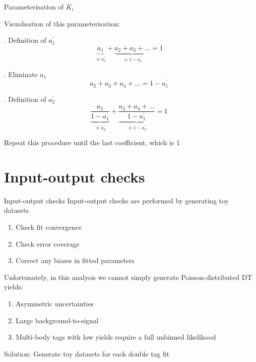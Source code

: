 \documentclass{beamer}
\begin{document}
\begin{frame}{Parameterisation of $K_i$}
  \vspace{0.0cm}
  \begin{center}
  {\large Visualisation of this parameterisation:}
  \end{center}
  \vspace{-0.3cm}
  \begin{center}
    \begin{block}{. Definition of $a_1^\prime$}
      \begin{equation*}
        \underbrace{a_1}_{\equiv a_1^\prime} + \underbrace{a_2 + a_3 + ...}_{\equiv 1 - a_1^\prime} = 1
      \end{equation*}
    \end{block}
    \begin{block}{. Eliminate $a_1$}
      \begin{equation*}
        a_2 + a_3 + a_4 + ... = 1 - a_1^\prime
      \end{equation*}
    \end{block}
    \begin{block}{. Definition of $a_2^\prime$}
      \begin{equation*}
        \underbrace{\frac{a_2}{1 - a_1^\prime}}_{\equiv a_2^\prime} + \underbrace{\frac{a_3 + a_4 + ...}{1 - a_1^\prime}}_{\equiv 1 - a_2^\prime} = 1
      \end{equation*}
    \end{block}
    Repeat this procedure until the last coefficient, which is $1$
  \end{center}
\end{frame}

\section{Input-output checks}
\begin{frame}{Input-output checks}
  \vspace{0.0cm}
  {\large Input-output checks are performed by generating toy datasets}
  \begin{enumerate}
    \item{Check fit convergence}
    \item{Check error coverage}
    \item{Correct any biases in fitted parameters}
  \end{enumerate}
  \vspace{0.5cm}
  {\large Unfortunately, in this analysis we cannot simply generate Poisson-distributed DT yields:}
  \begin{enumerate}
    \item{Asymmetric uncertainties}
    \item{Large background-to-signal}
    \item{Multi-body tags with low yields require a full unbinned likelihood}
  \end{enumerate}
  \vspace{0.5cm}
  \begin{center}
    {\Large Solution: Generate toy datasets for each double tag fit}
  \end{center}
\end{frame}
\end{document}
